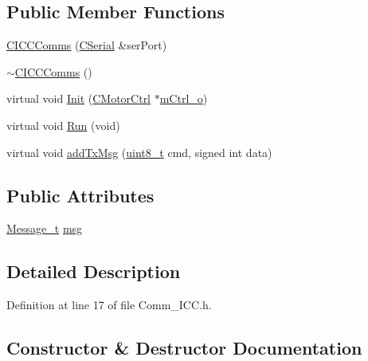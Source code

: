 \subsection*{Public Member Functions}
\begin{DoxyCompactItemize}
\item 
\mbox{\hyperlink{class_c_i_c_c_comms_af2cb9bb6ab473bc5ea2b4aa2f98084ff}{C\+I\+C\+C\+Comms}} (\mbox{\hyperlink{class_c_serial}{C\+Serial}} \&ser\+Port)
\item 
\mbox{\hyperlink{class_c_i_c_c_comms_a951ae11fd2024309bd4ecf67981287e7}{$\sim$\+C\+I\+C\+C\+Comms}} ()
\item 
virtual void \mbox{\hyperlink{class_c_i_c_c_comms_a56fc0858965ed1f1f9b3295602472c7e}{Init}} (\mbox{\hyperlink{class_c_motor_ctrl}{C\+Motor\+Ctrl}} $\ast$\mbox{\hyperlink{_a_d_a_s___m_c_u_8ino_a60ac8587f0c0967b5e3056da59168874}{m\+Ctrl\+\_\+o}})
\item 
virtual void \mbox{\hyperlink{class_c_i_c_c_comms_a8b3fa81307b3b9ba0e72b4aee8279c56}{Run}} (void)
\item 
virtual void \mbox{\hyperlink{class_c_i_c_c_comms_ab925dd7ff82f30ccd9f770ab2281b3ab}{add\+Tx\+Msg}} (\mbox{\hyperlink{_a_d_a_s___types_8h_aba7bc1797add20fe3efdf37ced1182c5}{uint8\+\_\+t}} cmd, signed int data)
\end{DoxyCompactItemize}
\subsection*{Public Attributes}
\begin{DoxyCompactItemize}
\item 
\mbox{\hyperlink{struct_c_i_c_c_comms_1_1_message__t}{Message\+\_\+t}} \mbox{\hyperlink{class_c_i_c_c_comms_a35a59d11110d830b70ab5e2a5644bbb9}{msg}}
\end{DoxyCompactItemize}


\subsection{Detailed Description}


Definition at line 17 of file Comm\+\_\+\+I\+C\+C.\+h.



\subsection{Constructor \& Destructor Documentation}
\mbox{\label{class_c_i_c_c_comms_af2cb9bb6ab473bc5ea2b4aa2f98084ff}} 
